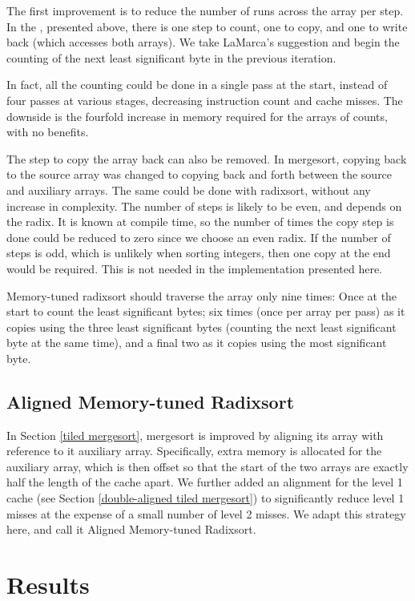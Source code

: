 The first improvement is to reduce the number of runs across the array per
step.  In the , presented above, there is one step to count,
one to copy, and one to write back (which accesses both arrays). We take
LaMarca's suggestion and begin the counting of the next least significant byte
in the previous iteration.

In fact, all the counting could be done in a single pass at the start, instead
of four passes at various stages, decreasing instruction count and cache misses.
The downside is the fourfold increase in memory required for the arrays of
counts, with no benefits.

The step to copy the array back can also be removed. In mergesort, copying back
to the source array was changed to copying back and forth between the source and
auxiliary arrays. The same could be done with radixsort, without any increase in
complexity. The number of steps is likely to be even, and depends on the radix.
It is known at compile time, so the number of times the copy step is done could
be reduced to zero since we choose an even radix. If the number of steps is odd,
which is unlikely when sorting integers, then one copy at the end would be
required. This is not needed in the implementation presented here.

Memory-tuned radixsort should traverse the array only nine times: Once at the
start to count the least significant bytes; six times (once per array per pass)
as it copies using the three least significant bytes (counting the next least
significant byte at the same time), and a final two as it copies using the most
significant byte.


\subsection{Aligned Memory-tuned Radixsort}
In Section \ref{tiled mergesort}, mergesort is improved by aligning its array
with reference to it auxiliary array. Specifically, extra memory is allocated
for the auxiliary array, which is then offset so that the start of the two
arrays are exactly half the length of the cache apart. We further added an
alignment for the level 1 cache (see Section \ref{double-aligned tiled
mergesort}) to significantly reduce level 1 misses at the expense of a small
number of level 2 misses. We adapt this strategy here, and call it Aligned
Memory-tuned Radixsort.


\section{Results}

